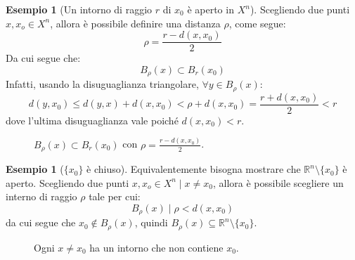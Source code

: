 \documentclass[11pt, a4paper, openright]{book}
\theoremstyle{plain}
\theoremstyle{definition}
\newtheorem{esempio}[teorema]{Esempio}
\theoremstyle{remark}
\begin{document}
\begin{esempio}[Un intorno di raggio $r$ di $x_0$ è aperto in $X^n$]
    Scegliendo due punti $x, x_o \in X^n$, allora è possibile definire una distanza $\rho$, come segue:
    \begin{equation}
        \rho = \frac{r - d(x, x_0)}{2}
    \end{equation}
    Da cui segue che:
    \begin{equation}
        B_\rho(x) \subset B_r(x_0)
    \end{equation}
    Infatti, usando la disuguaglianza triangolare, $\forall y \in B_\rho(x)$:
    \begin{equation}
        d(y, x_0) \leq d(y, x) + d(x, x_0) < \rho + d(x, x_0) = \frac{r + d(x, x_0)}{2} < r
    \end{equation}
    dove l'ultima disuguaglianza vale poiché $d(x, x_0) < r$.
\begin{figure}[H]
    \centering
    \caption{$B_\rho(x) \subset B_r(x_0)$ con $\rho = \frac{r - d(x, x_0)}{2}$.}
\end{figure}
\end{esempio}


\begin{esempio}[$\{x_0\}$ è chiuso]
    Equivalentemente bisogna mostrare che $\mathbb{R}^n \setminus \{x_0\}$ è aperto.
    Scegliendo due punti $x, x_o \in X^n \mid x \neq x_0$, allora è possibile scegliere un interno di raggio $\rho$ tale per cui:
    \begin{equation}
        B_\rho(x) \mid \rho < d(x, x_0)
    \end{equation}
    da cui segue che $x_0 \notin B_\rho(x)$, quindi $B_\rho(x) \subseteq \mathbb{R}^n \setminus \{x_0\}$.
\begin{figure}[H]
    \centering
    \caption{Ogni $x \neq x_0$ ha un intorno che non contiene $x_0$.}
\end{figure}
\end{esempio}
\end{document}
